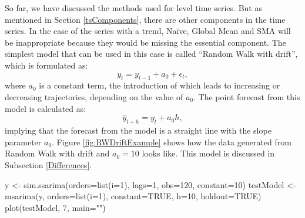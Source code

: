 \documentclass[
]{book}
\newenvironment{Shaded}{\begin{snugshade}}{\end{snugshade}}
\newcommand{\AttributeTok}[1]{\textcolor[rgb]{0.77,0.63,0.00}{#1}}
\newcommand{\ConstantTok}[1]{\textcolor[rgb]{0.00,0.00,0.00}{#1}}
\newcommand{\DecValTok}[1]{\textcolor[rgb]{0.00,0.00,0.81}{#1}}
\newcommand{\FunctionTok}[1]{\textcolor[rgb]{0.00,0.00,0.00}{#1}}
\newcommand{\NormalTok}[1]{#1}
\newcommand{\OtherTok}[1]{\textcolor[rgb]{0.56,0.35,0.01}{#1}}
\newcommand{\StringTok}[1]{\textcolor[rgb]{0.31,0.60,0.02}{#1}}
\theoremstyle{definition}
\theoremstyle{definition}
\theoremstyle{definition}
\theoremstyle{definition}
\theoremstyle{remark}
\begin{document}
So far, we have discussed the methods used for level time series. But as mentioned in Section \ref{tsComponents}, there are other components in the time series. In the case of the series with a trend, Naïve, Global Mean and SMA will be inappropriate because they would be missing the essential component. The simplest model that can be used in this case is called ``Random Walk with drift'', which is formulated as:
\begin{equation}
    y_t = y_{t-1} + a_0 + \epsilon_t,
    \label{eq:RandomWalkWithDrift}
\end{equation}
where \(a_0\) is a constant term, the introduction of which leads to increasing or decreasing trajectories, depending on the value of \(a_0\). The point forecast from this model is calculated as:
\begin{equation}
    \hat{y}_{t+h} = y_{t} + a_0 h,
    \label{eq:RandomWalkWithDriftForecast}
\end{equation}
implying that the forecast from the model is a straight line with the slope parameter \(a_0\). Figure \ref{fig:RWDriftExample} shows how the data generated from Random Walk with drift and \(a_0=10\) looks like. This model is discussed in Subsection \ref{Differences}.

\begin{Shaded}
\begin{Highlighting}[]
\NormalTok{y }\OtherTok{\textless{}{-}} \FunctionTok{sim.ssarima}\NormalTok{(}\AttributeTok{orders=}\FunctionTok{list}\NormalTok{(}\AttributeTok{i=}\DecValTok{1}\NormalTok{), }\AttributeTok{lags=}\DecValTok{1}\NormalTok{, }\AttributeTok{obs=}\DecValTok{120}\NormalTok{,}
                 \AttributeTok{constant=}\DecValTok{10}\NormalTok{)}
\NormalTok{testModel }\OtherTok{\textless{}{-}} \FunctionTok{msarima}\NormalTok{(y, }\AttributeTok{orders=}\FunctionTok{list}\NormalTok{(}\AttributeTok{i=}\DecValTok{1}\NormalTok{), }\AttributeTok{constant=}\ConstantTok{TRUE}\NormalTok{,}
                     \AttributeTok{h=}\DecValTok{10}\NormalTok{, }\AttributeTok{holdout=}\ConstantTok{TRUE}\NormalTok{)}
\FunctionTok{plot}\NormalTok{(testModel, }\DecValTok{7}\NormalTok{, }\AttributeTok{main=}\StringTok{""}\NormalTok{)}
\end{Highlighting}
\end{Shaded}
\end{document}
